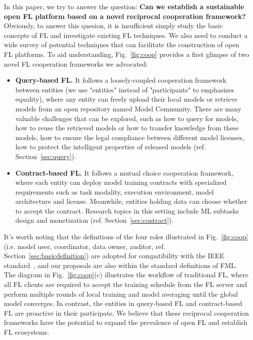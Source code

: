 In this paper, we try to answer the question: \textbf{Can we establish a sustainable open FL platform based on a novel reciprocal cooperation framework?}
Obviously, to answer this quesion, it is insufficient simply study the basic concepts of FL and investigate existing FL techniques.
We also need to conduct a wide survey of potential techniques that can facilitate the construction of open FL platforms.
To aid understanding, Fig.~\ref{fig:coop} provides a first glimpse of two novel FL cooperation frameworks we advocated: 
\begin{itemize}
    \item \textbf{Query-based FL.} It follows a loosely-coupled cooperation framework between entities (we use "entities" instead of "participants" to emphasizes equality), where any entity can freely upload their local models or retrieve models from an open repository named Model Community.
    There are many valuable challenges that can be explored, such as how to query for models, how to reuse the retrieved models or how to transfer knowledge from these models, how to ensure the legal compliance between different model licenses, how to protect the intelligent properties of released models (ref. Section~\ref{sec:query}). %
    \item \textbf{Contract-based FL.} It follows a mutual choice cooperation framework, where each entity can deploy model training contracts with specialized requirements such as task modality, execution environment, model architecture and license. Meanwhile, entities holding data can choose whether to accept the contract.
    Research topics in this setting include ML subtasks design and monetization (ref. Section~\ref{sec:contract}).
\end{itemize}
It's worth noting that the definitions of the four roles illustrated in Fig.~\ref{fig:coop} (i.e. model user, coordinator, data owner, auditor, ref. Section~\ref{sec:basicdefinition}) are adopted for compatibility with the IEEE standard~\cite{IEEEstd3652}, and our proposals are also within the standard definitions of FML.
The diagram in Fig.~\ref{fig:coop}(c) illustrates the workflow of traditional FL, where all FL clients are required to accept the training schedule from the FL server and perform multiple rounds of local training and model averaging until the global model converges.
In contrast, the entities in query-based FL and contract-based FL are proactive in their participate.
We believe that these reciprocal cooperation frameworks have the potential to expand the prevalence of open FL and establish FL ecosystems.


